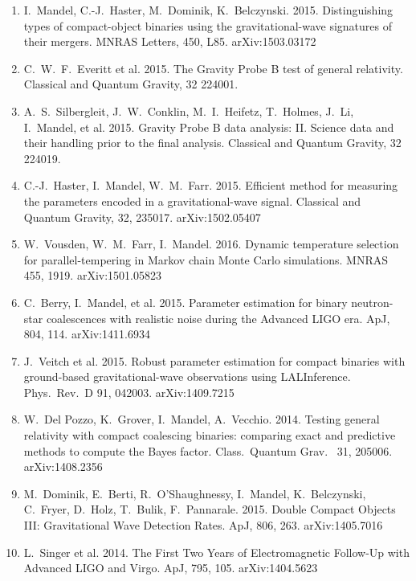 \documentclass[margin,line]{res}
\begin{document}
\begin{resume}
\begin{enumerate}
\item  I.~Mandel, C.-J.~Haster, M.~Dominik, K.~Belczynski.  2015.  Distinguishing types of compact-object binaries using the gravitational-wave signatures of their mergers.  MNRAS Letters, 450, L85. arXiv:1503.03172

\item C.~W.~F.~Everitt et al.  2015.  The Gravity Probe B test of general relativity.  Classical and Quantum Gravity, 32 224001.

\item A.~S.~Silbergleit, J.~W.~Conklin, M.~I.~Heifetz, T.~Holmes, J.~Li, I.~Mandel, et al. 2015.
Gravity Probe B data analysis: II. Science data and their handling prior to the final analysis.  Classical and Quantum Gravity, 32 224019.

\item  C.-J.~Haster, I.~Mandel,  W.~M.~Farr.  2015.  Efficient method for measuring the parameters encoded in a gravitational-wave signal.  Classical and Quantum Gravity, 32, 235017. arXiv:1502.05407

\item W.~Vousden, W.~M.~Farr, I.~Mandel.  2016. Dynamic temperature selection for parallel-tempering in Markov chain Monte Carlo simulations.  MNRAS 455, 1919. arXiv:1501.05823 

\item  C.~Berry, I.~Mandel, et al. 2015. Parameter estimation for binary neutron-star coalescences with realistic noise during the Advanced LIGO era.  ApJ, 804, 114.  arXiv:1411.6934

\item  J.~Veitch et al. 2015. Robust parameter estimation for compact binaries with ground-based gravitational-wave observations using LALInference. Phys.~Rev.~D 91, 042003. arXiv:1409.7215

\item  W.~Del Pozzo, K.~Grover, I.~Mandel, A.~Vecchio. 2014.  Testing general relativity with compact coalescing binaries: comparing exact and predictive methods to compute the Bayes factor. Class.~Quantum Grav.~ 31, 205006. arXiv:1408.2356

\item  M.~Dominik, E.~Berti, R.~O'Shaughnessy, I.~Mandel, K.~Belczynski, C.~Fryer, D.~Holz, T.~Bulik,  F.~Pannarale. 2015. Double Compact Objects III: Gravitational Wave Detection Rates.  ApJ, 806, 263.  arXiv:1405.7016

\item  L.~Singer et al. 2014. The First Two Years of Electromagnetic Follow-Up with Advanced LIGO and Virgo.  ApJ, 795, 105. arXiv:1404.5623


\end{enumerate}
\end{resume}
\end{document}
